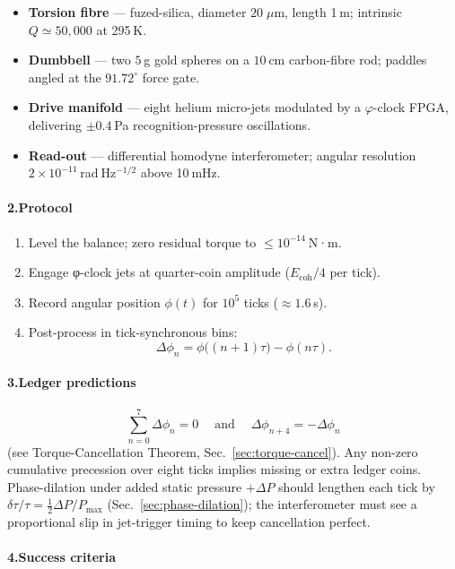 \documentclass[11pt,oneside]{book}
\begin{document}
\begin{itemize}
\item \textbf{Torsion fibre} — fuzed-silica, diameter $20\;\mu$m, length 1 m; intrinsic $Q\simeq 50{,}000$ at 295 K.
\item \textbf{Dumbbell} — two $5$ g gold spheres on a $10$ cm carbon-fibre rod; paddles angled at the $91.72^{\circ}$ force gate.
\item \textbf{Drive manifold} — eight helium micro-jets modulated by a $\varphi$-clock FPGA, delivering $\pm0.4$ Pa recognition-pressure oscillations.
\item \textbf{Read-out} — differential homodyne interferometer; angular resolution $2\times10^{-11}$ rad Hz$^{-1/2}$ above 10 mHz.
\end{itemize}

\paragraph*{2.\;Protocol}

\begin{enumerate}
\item Level the balance; zero residual torque to $\le10^{-14}$ N·m.
\item Engage φ-clock jets at quarter-coin amplitude ($E_{\text{coh}}/4$ per tick).
\item Record angular position $\phi(t)$ for $10^{5}$ ticks ($\approx 1.6$ s).
\item Post-process in tick-synchronous bins:
      \[
      \Delta\phi_n = \phi\bigl((n+1)\tau\bigr)-\phi(n\tau).
      \]
\end{enumerate}

\paragraph*{3.\;Ledger predictions}

\[
  \boxed{\;
  \sum_{n=0}^{7}\Delta\phi_n = 0
  \;}
  \quad\text{and}\quad
  \boxed{\;
  \Delta\phi_{n+4} = -\Delta\phi_n
  \;}
\]
(see Torque-Cancellation Theorem, Sec.~\ref{sec:torque-cancel}).  
Any non-zero cumulative precession over eight ticks implies missing or extra ledger coins.  
Phase-dilation under added static pressure $+\Delta P$ should lengthen each tick by
\(
  \delta\tau/\tau = \tfrac12\Delta P/P_{\max}
\)
(Sec.~\ref{sec:phase-dilation}); the interferometer must see a proportional slip in jet-trigger timing to keep cancellation perfect.

\paragraph*{4.\;Success criteria}
\end{document}

